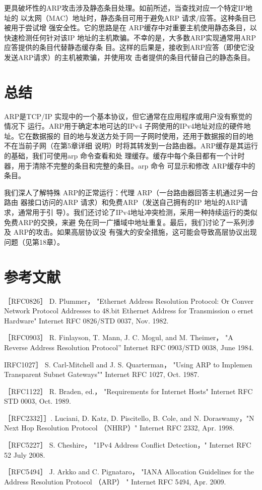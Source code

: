 更具破坏性的ARP攻击涉及静态条目处理。如前所述，当查找对应一个特定IP地址的
以太网（MAC）地址时，静态条目可用于避免ARP 请求/应答。这种条目已被用于尝试增
强安全性。它的思路是在 ARP缓存中对重要主机使用静态条目，以快速检测任何针对该IP
地址的主机欺骗。不幸的是，大多数ARP实现通常用ARP应答提供的条目代替静态缓存条
目。这样的后果是，接收到ARP应答（即使它没发送ARP请求）的主机被欺骗，并使用攻
击者提供的条目代替自己的静态条目。

\section{总结}

ARP是TCP/IP 实现中的一个基本协议，但它通常在应用程序或用户没有察觉的情况下
运行。ARP用于确定本地可达的IPv4 子网使用的IPv4地址对应的硬件地址。它在数据报的
目的地与发送方处于同一子网时使用，还用于数据报的目的地不在当前子网（在第5章详细
说明）时将其转发到一台路由器。ARP缓存是其运行的基础，我们可使用arp 命令查看和处
理缓存。缓存中每个条目都有一个计时器，用于清除不完整的条目和完整的条目。arp 命令
可显示和修改 ARP缓存中的条目。

我们深人了解特殊 ARP的正常运行：代理 ARP（一台路由器回答主机通过另一台路由
器接口访问的ARP 请求）和免费ARP（发送自己拥有的IP 地址的ARP请求，通常用于引
导）。我们还讨论了IPv4地址冲突检测，采用一种持续运行的类似免费ARP的交换，来避
免在同一广播域中地址重复。最后，我们讨论了一系列涉及 ARP的攻击。如果高层协议没
有强大的安全措施，这可能会导致高层协议出现问题（见第18章）。

\section{参考文献}

［RFC0826］ D. Plummer， "Ethernet Address Resolution Protocol: Or Conver
Network Protocol Addresses to 48.bit Ethernet Address for Transmission o
ernet Hardware" Internet RFC 0826/STD 0037, Nov. 1982.

［RFC0903］ R. Finlayson, T. Mann, J. C. Mogul, and M. Theimer， "A Reverse
Address Resolution Protocol” Internet RFC 0903/STD 0038, June 1984.

IRFC1027］ S. Carl-Mitchell and J. S. Quarterman， "Using ARP to Implemen
Transparent Subnet Gateways"" Internet RFC 1027, Oct. 1987.

［RFC1122］ R. Braden, ed.， "Requirements for Internet Hosts" Internet RFC
STD 0003, Oct. 1989.

［RFC2332］］. Luciani, D. Katz, D. Piscitello, B. Cole, and N. Doraswamy，"N
Next Hop Resolution Protocol （NHRP）" Internet RFC 2332, Apr. 1998.

［RFC5227］ S. Cheshire， "1Pv4 Address Conflict Detection，" Internet RFC 52
July 2008.

［RFC5494］ J. Arkko and C. Pignataro， "IANA Allocation Guidelines for the
Address Resolution Protocol （ARP） " Internet RFC 5494, Apr. 2009.